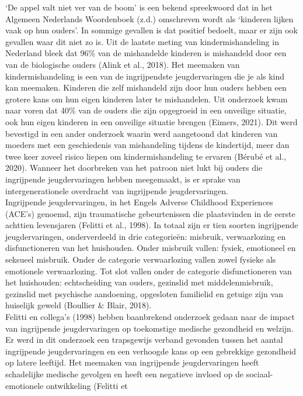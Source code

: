 \documentclass[12pt]{article}
\begin{document}
`De appel valt niet ver van de boom' is een bekend spreekwoord dat in
het Algemeen Nederlands Woordenboek (z.d.) omschreven wordt als
`kinderen lijken vaak op hun ouders'. In sommige gevallen is dat
positief bedoelt, maar er zijn ook gevallen waar dit niet zo is. Uit de
laatste meting van kindermishandeling in Nederland bleek dat 96\% van de
mishandelde kinderen is mishandeld door een van de biologische ouders
(Alink et al., 2018). Het meemaken van kindermishandeling is een van de
ingrijpendste jeugdervaringen die je als kind kan meemaken. Kinderen die
zelf mishandeld zijn door hun ouders hebben een grotere kans om hun
eigen kinderen later te mishandelen. Uit onderzoek kwam naar voren dat
40\% van de ouders die zijn opgegroeid in een onveilige situatie, ook
hun eigen kinderen in een onveilige situatie brengen (Eimers, 2021). Dit
werd bevestigd in een ander onderzoek waarin werd aangetoond dat
kinderen van moeders met een geschiedenis van mishandeling tijdens de
kindertijd, meer dan twee keer zoveel risico liepen om
kindermishandeling te ervaren (Bérubé et al., 2020). Wanneer het
doorbreken van het patroon niet lukt bij ouders die ingrijpende
jeugdervaringen hebben meegemaakt, is er sprake van intergenerationele
overdracht van ingrijpende jeugdervaringen.\\
Ingrijpende jeugdervaringen, in het Engels Adverse Childhood Experiences
(ACE's) genoemd, zijn traumatische gebeurtenissen die plaatsvinden in de
eerste achttien levensjaren (Felitti et al., 1998). In totaal zijn er
tien soorten ingrijpende jeugdervaringen, onderverdeeld in drie
categorieën: misbruik, verwaarlozing en disfunctioneren van het
huishouden. Onder misbruik vallen: fysiek, emotioneel en seksueel
misbruik. Onder de categorie verwaarlozing vallen zowel fysieke als
emotionele verwaarlozing. Tot slot vallen onder de categorie
disfunctioneren van het huishouden: echtscheiding van ouders, gezinslid
met middelenmisbruik, gezinslid met psychische aandoening, opgesloten
familielid en getuige zijn van huiselijk geweld (Boullier \& Blair,
2018).\\
Felitti en collega's (1998) hebben baanbrekend onderzoek gedaan naar de
impact van ingrijpende jeugdervaringen op toekomstige medische
gezondheid en welzijn. Er werd in dit onderzoek een trapsgewijs verband
gevonden tussen het aantal ingrijpende jeugdervaringen en een verhoogde
kans op een gebrekkige gezondheid op latere leeftijd. Het meemaken van
ingrijpende jeugdervaringen heeft schadelijke medische gevolgen en heeft
een negatieve invloed op de sociaal-emotionele ontwikkeling (Felitti et
\end{document}
